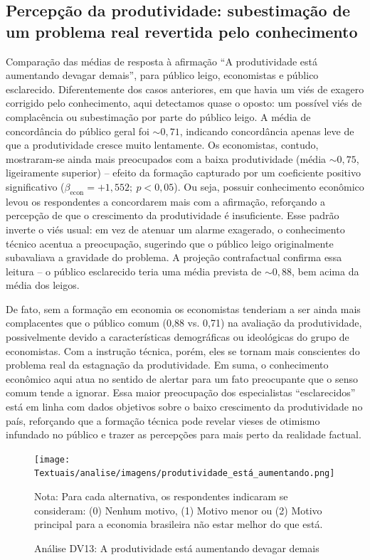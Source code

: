 \subsection{Percepção da produtividade: subestimação de um problema real revertida pelo conhecimento}

Comparação das médias de resposta à afirmação “A produtividade está aumentando devagar demais”, para público leigo, economistas e público esclarecido. Diferentemente dos casos anteriores, em que havia um viés de exagero corrigido pelo conhecimento, aqui detectamos quase o oposto: um possível viés de complacência ou subestimação por parte do público leigo. A média de concordância do público geral foi $\sim 0{,}71$, indicando concordância apenas leve de que a produtividade cresce muito lentamente. Os economistas, contudo, mostraram-se ainda mais preocupados com a baixa produtividade (média $\sim 0{,}75$, ligeiramente superior) – efeito da formação capturado por um coeficiente positivo significativo ($\beta_{\text{econ}} = +1{,}552;\ p<0{,}05$). Ou seja, possuir conhecimento econômico levou os respondentes a concordarem mais com a afirmação, reforçando a percepção de que o crescimento da produtividade é insuficiente. Esse padrão inverte o viés usual: em vez de atenuar um alarme exagerado, o conhecimento técnico acentua a preocupação, sugerindo que o público leigo originalmente subavaliava a gravidade do problema. A projeção contrafactual confirma essa leitura – o público esclarecido teria uma média prevista de $\sim 0{,}88$, bem acima da média dos leigos.

De fato, sem a formação em economia os economistas tenderiam a ser ainda mais complacentes que o público comum (0,88 vs. 0,71) na avaliação da produtividade, possivelmente devido a características demográficas ou ideológicas do grupo de economistas. Com a instrução técnica, porém, eles se tornam mais conscientes do problema real da estagnação da produtividade. Em suma, o conhecimento econômico aqui atua no sentido de alertar para um fato preocupante que o senso comum tende a ignorar. Essa maior preocupação dos especialistas “esclarecidos” está em linha com dados objetivos sobre o baixo crescimento da produtividade no país, reforçando que a formação técnica pode revelar vieses de otimismo infundado no público e trazer as percepções para mais perto da realidade factual.

\begin{figure}[htbp]
    \centering
    \texttt{[image: Textuais/analise/imagens/produtividade\_está\_aumentando.png]}
    \caption{Análise DV13: A produtividade está aumentando devagar demais}
    \smallskip
    Nota: Para cada alternativa, os respondentes indicaram se consideram: (0) Nenhum motivo, (1) Motivo menor ou (2) Motivo principal para a economia brasileira não estar melhor do que está.
    \label{fig:produtividade_esta_aumentando}
\end{figure}


